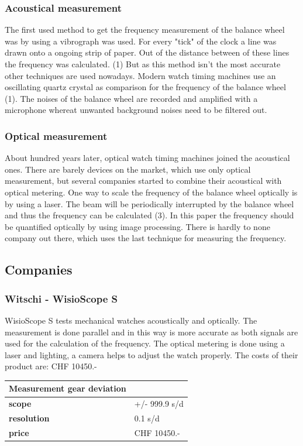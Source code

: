\documentclass[12pt, a4paper]{report}
\begin{document}
    \subsubsection{Acoustical measurement}
    The first used method to get the frequency measurement of the balance wheel was by using a vibrograph was used. For every "tick" of the clock a line was drawn onto a ongoing strip of paper. Out of the distance between of these lines the frequency was calculated. (1) But as this method isn't the most accurate other techniques are used nowadays.  
    Modern watch timing machines use an oscillating quartz crystal as comparison for the frequency of the balance wheel (1). The noises of the balance wheel are recorded and amplified with a microphone whereat unwanted background noises need to be filtered out. 
    
    \subsubsection{Optical measurement}
    About hundred years later, optical watch timing machines joined the acoustical ones. There are barely devices on the market, which use only optical measurement, but several companies started to combine their acoustical with optical metering. One way to scale the frequency of the balance wheel optically is by using a laser. The beam will be periodically interrupted by the balance wheel and thus the frequency can be calculated (3). In this paper the frequency should be quantified optically by using image processing. There is hardly to none company out there, which uses the last technique for measuring the frequency.
    
    \subsection{Companies}
    \subsubsection{Witschi - WisioScope S}
    WisioScope S tests mechanical watches acoustically and optically. The measurement is done parallel and in this way is more accurate as both signals are used for the calculation of the frequency.
    The optical metering is done using a laser and lighting, a camera helps to adjust the watch properly. The costs of their product are: CHF 10450.-
    
    \bigskip
    
    \begin{tabularx}{\textwidth}{>{\bfseries}lX}
    Measurement gear deviation & \\\toprule
    scope & +/- 999.9 s/d \\\midrule
    resolution & 0.1 s/d\\\midrule
    price & CHF 10450.-\\\bottomrule
    \end{tabularx}
    
\end{document}
